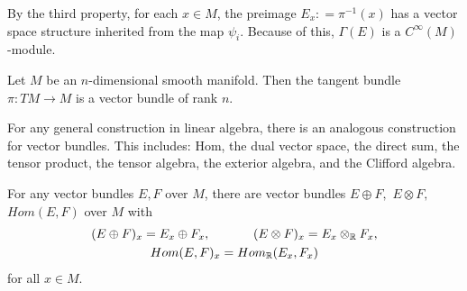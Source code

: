 \documentclass{ximera}
\begin{document}
\begin{remark}
    By the third property, for each $x \in M$, the preimage $E_x : = \pi ^{-1} (x)$ has a vector space structure inherited from the map $\psi_i $. Because of this, $\Gamma (E)$ is a $C^{\infty} (M)$-module. 
\end{remark}

\begin{example}
Let $M$ be an $n$-dimensional smooth manifold. Then the tangent bundle $\pi : TM \to M$ is a vector bundle of rank $n$.    
\end{example}


\begin{theorem}
        For any general construction in linear algebra, there is an analogous construction for vector bundles. This includes: Hom, the dual vector space, the direct sum, the tensor product, the tensor algebra, the exterior algebra, and the Clifford algebra.
\end{theorem}


\begin{example}
    For any vector bundles $E, F  $ over $M$,  there  are vector bundles  $E \oplus F ,$ $ E\otimes F,  $ $ Hom (E, F)$ over $M$ with
    \begin{gather*}
        (E \oplus F) _x =  E_x \oplus F_x  , \hspace{1.2cm} (E \otimes F) _x = E_x \otimes _{\mathbb{R}} F_x  , \\
          Hom(E,F)_x = Hom_{\mathbb{R}}(E_x, F_x)
    \end{gather*}
    for all $x \in M$.
\end{example}
\end{document}
